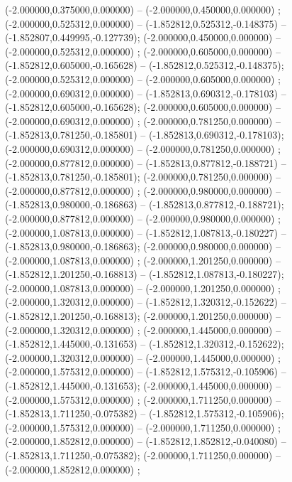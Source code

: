  (-2.000000,0.375000,0.000000) -- (-2.000000,0.450000,0.000000) ;
 (-2.000000,0.525312,0.000000) -- (-1.852812,0.525312,-0.148375) -- (-1.852807,0.449995,-0.127739);
 (-2.000000,0.450000,0.000000) -- (-2.000000,0.525312,0.000000) ;
 (-2.000000,0.605000,0.000000) -- (-1.852812,0.605000,-0.165628) -- (-1.852812,0.525312,-0.148375);
 (-2.000000,0.525312,0.000000) -- (-2.000000,0.605000,0.000000) ;
 (-2.000000,0.690312,0.000000) -- (-1.852813,0.690312,-0.178103) -- (-1.852812,0.605000,-0.165628);
 (-2.000000,0.605000,0.000000) -- (-2.000000,0.690312,0.000000) ;
 (-2.000000,0.781250,0.000000) -- (-1.852813,0.781250,-0.185801) -- (-1.852813,0.690312,-0.178103);
 (-2.000000,0.690312,0.000000) -- (-2.000000,0.781250,0.000000) ;
 (-2.000000,0.877812,0.000000) -- (-1.852813,0.877812,-0.188721) -- (-1.852813,0.781250,-0.185801);
 (-2.000000,0.781250,0.000000) -- (-2.000000,0.877812,0.000000) ;
 (-2.000000,0.980000,0.000000) -- (-1.852813,0.980000,-0.186863) -- (-1.852813,0.877812,-0.188721);
 (-2.000000,0.877812,0.000000) -- (-2.000000,0.980000,0.000000) ;
 (-2.000000,1.087813,0.000000) -- (-1.852812,1.087813,-0.180227) -- (-1.852813,0.980000,-0.186863);
 (-2.000000,0.980000,0.000000) -- (-2.000000,1.087813,0.000000) ;
 (-2.000000,1.201250,0.000000) -- (-1.852812,1.201250,-0.168813) -- (-1.852812,1.087813,-0.180227);
 (-2.000000,1.087813,0.000000) -- (-2.000000,1.201250,0.000000) ;
 (-2.000000,1.320312,0.000000) -- (-1.852812,1.320312,-0.152622) -- (-1.852812,1.201250,-0.168813);
 (-2.000000,1.201250,0.000000) -- (-2.000000,1.320312,0.000000) ;
 (-2.000000,1.445000,0.000000) -- (-1.852812,1.445000,-0.131653) -- (-1.852812,1.320312,-0.152622);
 (-2.000000,1.320312,0.000000) -- (-2.000000,1.445000,0.000000) ;
 (-2.000000,1.575312,0.000000) -- (-1.852812,1.575312,-0.105906) -- (-1.852812,1.445000,-0.131653);
 (-2.000000,1.445000,0.000000) -- (-2.000000,1.575312,0.000000) ;
 (-2.000000,1.711250,0.000000) -- (-1.852813,1.711250,-0.075382) -- (-1.852812,1.575312,-0.105906);
 (-2.000000,1.575312,0.000000) -- (-2.000000,1.711250,0.000000) ;
 (-2.000000,1.852812,0.000000) -- (-1.852812,1.852812,-0.040080) -- (-1.852813,1.711250,-0.075382);
 (-2.000000,1.711250,0.000000) -- (-2.000000,1.852812,0.000000) ;
